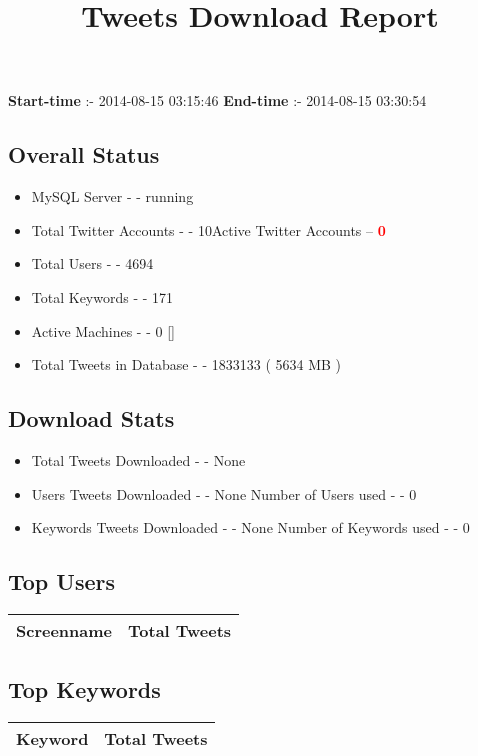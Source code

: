 \documentclass{article}\usepackage[T1]{fontenc}
\begin{document}
\title{\textbf{Tweets Download Report}}
               \date{}
                \maketitle
               \centerline{\textbf{Start-time} :- 2014-08-15 03:15:46 \hspace{40pt} \textbf{End-time} :- 2014-08-15 03:30:54}               \subsection*{Overall Status}                \begin{itemize}                \item MySQL Server - - running               \item Total Twitter Accounts - - 10\newline Active Twitter Accounts -- \textcolor{red}{\textbf{0}}               \item Total Users - - 4694               \item Total Keywords - - 171               \item Active Machines - - 0 []               \item Total Tweets in Database - - 1833133 ( 5634 MB )               \end{itemize}               \subsection*{Download Stats}                \begin{itemize}                \item Total Tweets Downloaded - - None               \item Users Tweets Downloaded - - None \newline Number of Users used - - 0               \item Keywords Tweets Downloaded - - None \newline Number of Keywords used - - 0              \end{itemize}              \subsection*{Top Users}\begin{tabular}{|c|c|}         \hline         Screenname & Total Tweets \\ 
 \hline
\end{tabular}\subsection*{Top Keywords}\begin{tabular}{|c|c|}         \hline         Keyword & Total Tweets \\ 
 \hline
\end{tabular}
\end{document}
